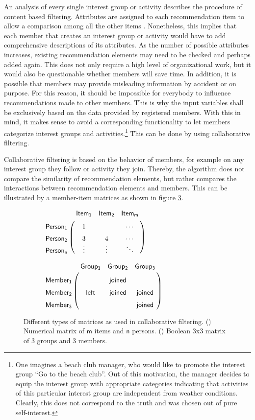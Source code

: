 \documentclass[12pt,numbers=noenddot,parskip,bibliography=totocnumbered,listof=totocnumbered,draft]{scrreprt}
\begin{document}
An analysis of every single interest group or activity describes the procedure of content based filtering. Attributes are assigned to each recommendation item to allow a comparison among all the other items \citep[p.42]{klahold2009}. Nonetheless, this implies that each member that creates an interest group or activity would have to add comprehensive descriptions of its attributes. As the number of possible attributes increases, existing recommendation elements may need to be checked and perhaps added again. This does not only require a high level of organizational work, but it would also be questionable whether members will save time. In addition, it is possible that members may provide misleading information by accident or on purpose. For this reason, it should be impossible for everybody to influence recommendations made to other members. This is why the input variables shall be exclusively based on the data provided by registered members. With this in mind, it makes sense to avoid a corresponding functionality to let members categorize interest groups and activities.\footnote{One imagines a beach club manager, who would like to promote the interest group ``Go to the beach club''. Out of this motivation, the manager decides to equip the interest group with appropriate categories indicating that activities of this particular interest group are independent from weather conditions. Clearly, this does not correspond to the truth and was chosen out of pure self-interest.} This can be done by using collaborative filtering. 

Collaborative filtering is based on the behavior of members, for example on any interest group they follow or activity they join. \citep[p.62]{klahold2009} Thereby, the algorithm does not compare the similarity of recommendation elements, but rather compares the interactions between recommendation elements and members. This can be illustrated by a member-item matrices as shown in figure \ref{matrix}.

\begin{figure}
\begin{subfigure}[t]{0.5\textwidth}%
\centering
$\bordermatrix{~ & \mathsf{Item_1} & \mathsf{Item_2} & \mathsf{Item_m} \cr
\vphantom{\vdots}\mathsf{Person_1} & 1 &  & \cdots  \cr
\vphantom{\vdots}\mathsf{Person_2} & 3 & 4 & \cdots \cr
\vphantom{\vdots}\mathsf{Person_n} & \vdotswithin{3} & \vdotswithin{4} & \ddots  }$
\caption{}
\label{nummatrix}
\end{subfigure}%
\begin{subfigure}[t]{0.5\textwidth}%
\centering
$\bordermatrix{~ & \mathsf{Group_1} & \mathsf{Group_2} & \mathsf{Group_3} \cr
\vphantom{\vdots}\mathsf{Member_1} &  & \mathsf{joined} &  \cr
\vphantom{\vdots}\mathsf{Member_2} & \mathsf{left} & \mathsf{joined} & \mathsf{joined} \cr
\vphantom{\vdots}\mathsf{Member_3} & &  & \mathsf{joined} }$
\caption{}
\label{boolmatrix}
\end{subfigure}%
\caption[Member-item matrices of collaborative filtering]{Different types of matrices as used in collaborative filtering. () Numerical matrix of $\mathsf{m}$ items and $\mathsf{n}$ persons. () Boolean 3x3 matrix of 3 groups and 3 members.}
\label{matrix}
\end{figure}
\end{document}
